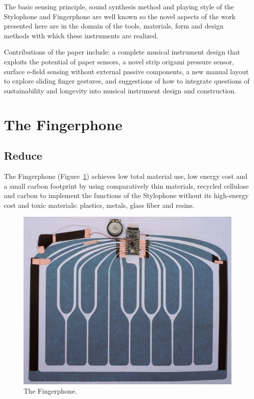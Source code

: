 The basic sensing principle, sound synthesis method and playing style of the
Stylophone and Fingerphone are well known so the novel aspects of the work
presented here are in the domain of the tools, materials, form and design methods
with which these instruments are realized.

Contributions of the paper include: a complete musical instrument
design that exploits the potential of paper sensors, a novel strip origami
pressure sensor, surface e-field sensing without external passive components, a
new manual layout to explore sliding finger gestures, and suggestions of how to
integrate questions of sustainability and longevity into musical instrument
design and construction.

\section{The Fingerphone}

\subsection{Reduce}

The Fingerphone (Figure~\ref{Freed:img-2}) achieves low total material use, low energy cost and
a small carbon footprint by using comparatively thin materials, recycled
cellulose and carbon to implement the functions of the Stylophone without its
high-energy cost and toxic materials: plastics, metals, glass fiber and resins.

\begin{figure}[t]
\centering
\includegraphics[width=\textwidth]{fig2}
\caption{The Fingerphone.}
\label{Freed:img-2}
\end{figure}


